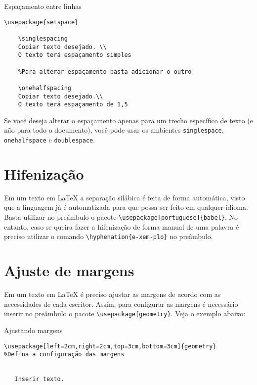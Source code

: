 \begin{trailer}{Espaçamento entre linhas}
\begin{verbatim}
\usepackage{setspace}  

    \singlespacing
    Copiar texto desejado. \\
    O texto terá espaçamento simples 

    %Para alterar espaçamento basta adicionar o outro

    \onehalfspacing
    Copiar texto desejado.\\
    O texto terá espaçamento de 1,5

\end{verbatim}
\end{trailer}

\noindent Se você deseja alterar o espaçamento apenas para um trecho específico de texto (e não para todo o documento), você pode usar os ambientes \verb|singlespace|, \verb|onehalfspace| e \verb|doublespace|. 

\section{Hifenização}
Em um texto em \LaTeX{} a separação silábica é feita de forma automática, visto que a linguagem já é automatizada para que possa ser feito em qualquer idioma. Basta utilizar no preâmbulo o pacote \verb|\usepackage[portuguese]{babel}|. No entanto, caso se queira fazer a hifenização de forma manual de uma palavra é preciso utilizar o comando \verb|\hyphenation{e-xem-plo}| no preâmbulo. 


\section{Ajuste de margens}
Em um texto em \LaTeX{} é preciso ajustar as margens de acordo com as necessidades de cada escritor. Assim, para configurar as margens é necessário inserir no preâmbulo  o pacote \verb|\usepackage{geometry}|. Veja o exemplo abaixo:
\begin{trailer}{Ajustando margens}
\begin{verbatim}
\usepackage[left=2cm,right=2cm,top=3cm,bottom=3cm]{geometry}
%Defina a configuração das margens


   Inserir texto.

\end{verbatim}
\end{trailer}


